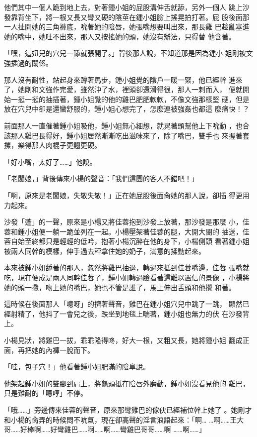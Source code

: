 他們其中一個人跪到地上去，對著鍾小姐的屁股溝伸舌就舔，另外一個人
跳上沙發靠背坐下，將一根又長又彎又硬的陰莖在鍾小姐臉上搖晃拍打著。屁
股後面那一人扯開她的三角褲底，吮著她的陰唇，她張嘴想要叫出來，那長雞
巴趁亂塞進她的嘴中，她吐不出來，那人又按搖她的頭，她沒有辦法，只得替
他含著。

「嘿，這妞兒的穴兒一舔就張開了。」背後那人說，不知道那是因為鍾小
姐剛被文強插過的關係。

那人沒有耐性，站起身來蹲著馬步，鍾小姐覺的陰戶一暖一緊，他已經幹
進來了，她剛和文強作完愛，雖然沖了水，裡頭卻還滑得很，那人一刺而入，
便就開始一挺一挺的抽插著，鍾小姐覺的他的雞巴肥肥軟軟，不像文強那樣堅
硬，但是放在穴兒中卻是還蠻舒服的，鍾小姐心想完了，怎麼連被強姦也都這
麼痛快！？

前面那人一直催著鍾小姐吸他，鍾小姐無心細想，就晃著頭幫他上下吮動
，也合該那人雞巴長得好，鍾小姐居然漸漸吃出滋味來了，除了嘴巴，雙手也
來握著套摞，樂得那人肉棍子更翹更硬。

「好小嘴，太好了……」他說。

「老闆娘，」背後傳來小楊的聲音：「我們這團的客人不錯吧！」

「啊，原來是老闆娘，失敬失敬！」正在她屁股後面肏她的那人說，卻插
得更用力起來。

沙發「蓬」的一聲，原來是小楊又將佳蓉抱到沙發上放著，那沙發是那麼
小，佳蓉和鍾小姐便一躺一跪並列在一起。小楊壓架著佳蓉的腿，大開大閤的
抽送，佳蓉自始至終都只是輕輕的低吟，抱著小楊沉醉在他的身下，小楊側頭
看著鍾小姐被兩人同幹的模樣，伸手過去秤拿住她的奶子，滿意的揉動起來。

本來被鍾小姐舔著的那人，忽然將雞巴抽退，轉過來抵到佳蓉嘴邊，佳蓉
張嘴就吃，現在便成是兩人同幹佳蓉了，鍾小姐轉過臉看著這難以置信的景像
，小楊將她的頭一攬，吻上她的嘴巴，她也不管是誰了，馬上伸出舌頭和他攪
和著。

這時候在後面那人「噫呀」的擠著聲音，雞巴在鍾小姐穴兒中跳了一跳，
顯然已經射精了，他抖了一會兒之後，跌坐到地毯上喘著，鍾小姐也無力的伏
在沙發背上。

小楊見狀，將雞巴一拔，乖乖隆得咚，好大一根，又粗又長，她將鍾小姐
翻成正面，再把她的內褲一脫而下。

「哇，包子穴！」他看著鍾小姐肥滿的陰阜說。

他架起鍾小姐的雙腳到肩上，將龜頭抵在陰唇外磨動，鍾小姐沒看見他的
雞巴，只是難耐的「嗯哼」不停。

「哦……」旁邊傳來佳蓉的聲音，原來那彎雞巴的傢伙已經補位幹上她了
。她剛才和小楊的肏弄的時候悶不吭氣，現在卻高聲的淫言浪語起來：「啊…
…啊……王大哥……好棒啊……好彎雞巴……啊……啊……彎雞巴哥哥……啊
……啊……」

